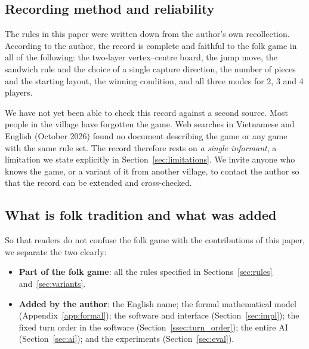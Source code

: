 \subsection{Recording method and reliability}

The rules in this paper were written down from the author's own
recollection. According to the author, the record is complete and faithful
to the folk game in all of the following: the two-layer vertex--centre
board, the jump move, the sandwich rule and the choice of a single capture
direction, the number of pieces and the starting layout, the winning
condition, and all three modes for 2, 3 and 4 players.

We have not yet been able to check this record against a second source.
Most people in the village have forgotten the game. Web searches in
Vietnamese and English (October 2026) found no document describing the game
or any game with the same rule set. The record therefore rests on \emph{a
single informant}, a limitation we state explicitly in
Section~\ref{sec:limitations}. We invite anyone who knows the game, or a
variant of it from another village, to contact the author so that the
record can be extended and cross-checked.

\subsection{What is folk tradition and what was added}

So that readers do not confuse the folk game with the contributions of this
paper, we separate the two clearly:
\begin{itemize}
  \item \textbf{Part of the folk game}: all the rules specified in
        Sections~\ref{sec:rules} and~\ref{sec:variants}.
  \item \textbf{Added by the author}: the English name; the formal
        mathematical model (Appendix~\ref{app:formal}); the software and
        interface (Section~\ref{sec:impl}); the fixed turn order in the
        software (Section~\ref{ssec:turn_order}); the entire AI
        (Section~\ref{sec:ai}); and the experiments
        (Section~\ref{sec:eval}).
\end{itemize}
